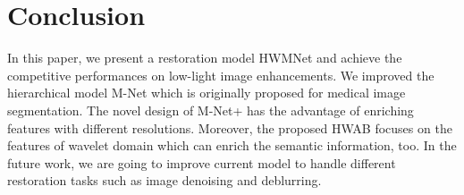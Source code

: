 \documentclass{article}
\begin{document}
\section{Conclusion}
In this paper, we present a restoration model HWMNet and achieve the competitive performances on low-light image enhancements. We improved the hierarchical model M-Net which is originally proposed for medical image segmentation. The novel design of M-Net+ has the advantage of enriching features with different resolutions. Moreover, the proposed HWAB focuses on the features of wavelet domain which can enrich the semantic information, too. In the future work, we are going to improve current model to handle different restoration tasks such as image denoising and deblurring.


\fontsize{8.5pt}{8.5pt}
\selectfont

\end{document}
